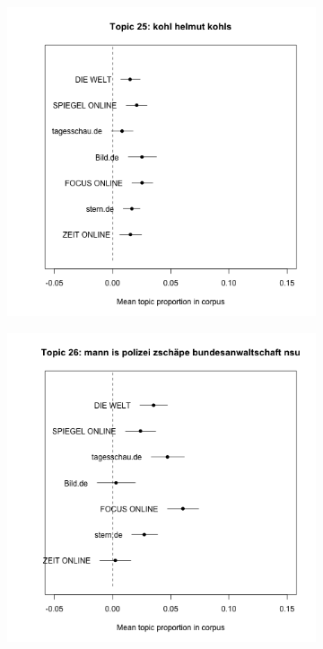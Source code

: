 \documentclass[12pt,a4paper,notitlepage]{article}
\begin{document}
\begin{figure}[H]
\begin{center}
\begin{subfigure}[normla]{0.2\textwidth}
		\end{subfigure}
		\begin{subfigure}[normla]{0.2\textwidth}
			\includegraphics[width=\textwidth]{../figs/estimate_effect25.png}
		\end{subfigure}
		\begin{subfigure}[normla]{0.2\textwidth}
			\includegraphics[width=\textwidth]{../figs/estimate_effect26.png}

\end{subfigure}
\end{center}
\end{figure}
\end{document}
